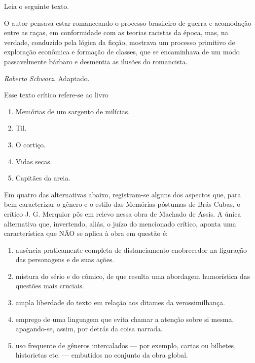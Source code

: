 \documentclass[twocolumn,landscape]{amsart}
\begin{document}
\begin{questao}
  Leia o seguinte texto.

  O autor pensava estar romanceando o processo brasileiro de guerra e
  acomodação entre as raças, em conformidade com as teorias racistas da
  época, mas, na verdade, conduzido pela lógica da ficção, mostrava um
  processo primitivo de exploração econômica e formação de classes, que
  se encaminhava de um modo passavelmente bárbaro e desmentia as ilusões
  do romancista.
  \begin{flushright}
    \emph{Roberto Schwarz}. Adaptado.
  \end{flushright}
  Esse texto crítico refere-se ao livro
  \begin{enumerate}[\bf a.]
    \item Memórias de um sargento de milícias.
    \item Til.
    \item O cortiço. %
    \item Vidas secas.
    \item Capitães da areia.
  \end{enumerate}
\end{questao}
\clearpage

\begin{questao}
  Em quatro das alternativas abaixo, registram-se alguns dos aspectos
  que, para bem caracterizar o gênero e o estilo das Memórias póstumas
  de Brás Cubas, o crítico J. G. Merquior pôs em relevo nessa obra de
  Machado de Assis. A única alternativa que, invertendo, aliás, o juízo
  do mencionado crítico, aponta uma característica que NÃO se aplica à
  obra em questão é:
  \begin{enumerate}[\bf a.]
    \item ausência praticamente completa de distanciamento enobrecedor
    na figuração das personagens e de suas ações.
    \item mistura do sério e do cômico, de que resulta uma abordagem
    humorística das questões mais cruciais.
    \item ampla liberdade do texto em relação aos ditames da
    verossimilhança.
    \item emprego de uma linguagem que evita chamar a atenção sobre si
    mesma, apagando-se, assim, por detrás da coisa narrada. %
    \item uso frequente de gêneros intercalados --- por exemplo, cartas ou
    bilhetes, historietas etc. --- embutidos no conjunto da obra
    global.
  \end{enumerate}
\end{questao}
\clearpage
\end{document}
